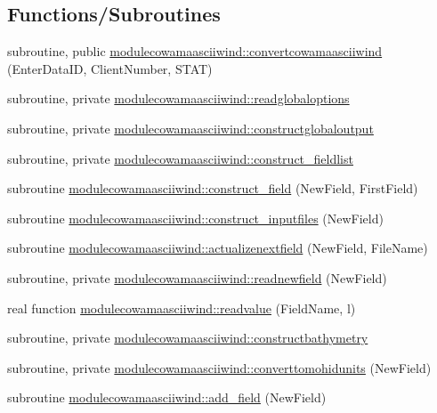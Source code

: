 \subsection*{Functions/\+Subroutines}
\begin{DoxyCompactItemize}
\item 
subroutine, public \mbox{\hyperlink{namespacemodulecowamaasciiwind_a76bf63c9a36126aed55309270f63abe4}{modulecowamaasciiwind\+::convertcowamaasciiwind}} (Enter\+Data\+ID, Client\+Number, S\+T\+AT)
\item 
subroutine, private \mbox{\hyperlink{namespacemodulecowamaasciiwind_a8a6f6a971c31c5b3f8b965bb818c1cbc}{modulecowamaasciiwind\+::readglobaloptions}}
\item 
subroutine, private \mbox{\hyperlink{namespacemodulecowamaasciiwind_a52864e15417a95bd07a7bac59fc24b28}{modulecowamaasciiwind\+::constructglobaloutput}}
\item 
subroutine, private \mbox{\hyperlink{namespacemodulecowamaasciiwind_a473204a88af20d0403e8a3f6d6230232}{modulecowamaasciiwind\+::construct\+\_\+fieldlist}}
\item 
subroutine \mbox{\hyperlink{namespacemodulecowamaasciiwind_a661012c07a9e926668c44de9bfc8e1ae}{modulecowamaasciiwind\+::construct\+\_\+field}} (New\+Field, First\+Field)
\item 
subroutine \mbox{\hyperlink{namespacemodulecowamaasciiwind_ab2311b5176ff0df25428cb105c33cf81}{modulecowamaasciiwind\+::construct\+\_\+inputfiles}} (New\+Field)
\item 
subroutine \mbox{\hyperlink{namespacemodulecowamaasciiwind_a267c21bbee12efe50d8afcde5075671c}{modulecowamaasciiwind\+::actualizenextfield}} (New\+Field, File\+Name)
\item 
subroutine, private \mbox{\hyperlink{namespacemodulecowamaasciiwind_a34be2c2a2675d82ce063773657b99a0a}{modulecowamaasciiwind\+::readnewfield}} (New\+Field)
\item 
real function \mbox{\hyperlink{namespacemodulecowamaasciiwind_a3e1412f70915d204c75940a89c18a417}{modulecowamaasciiwind\+::readvalue}} (Field\+Name, l)
\item 
subroutine, private \mbox{\hyperlink{namespacemodulecowamaasciiwind_a1fde1515d3a9c4b1b2737393842f1f39}{modulecowamaasciiwind\+::constructbathymetry}}
\item 
subroutine, private \mbox{\hyperlink{namespacemodulecowamaasciiwind_abd7579d6017af5f1f691051cd07a84a5}{modulecowamaasciiwind\+::converttomohidunits}} (New\+Field)
\item 
subroutine \mbox{\hyperlink{namespacemodulecowamaasciiwind_ac11c8ada96001555421156bb05d44db1}{modulecowamaasciiwind\+::add\+\_\+field}} (New\+Field)

\end{DoxyCompactItemize}
